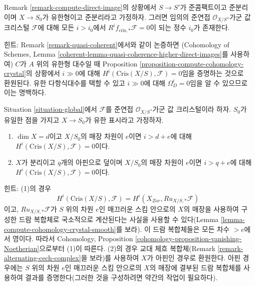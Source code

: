 \begin{remark}[유계성]
\label{remark-bounded-cohomology}
Remark \ref{remark-compute-direct-image}의 상황에서 $S \to S'$가
준콤팩트이고 준분리이며 $X \to S_0$가 유한형이고 준분리라고
가정하자. 그러면 임의의 준연접 $\mathcal{O}_{X/S}$-가군 값
크리스털 $\mathcal{F}$에 대해 모든 $i > i_0$에서
$R^if_{\text{cris}, *}\mathcal{F} = 0$이 되는 정수 $i_0$가 존재한다.

\medskip\noindent
힌트: Remark \ref{remark-quasi-coherent}에서와 같이 논증하면
(Cohomology of Schemes, Lemma
\ref{coherent-lemma-quasi-coherence-higher-direct-images}를 사용하여)
$C$가 $A$ 위의 유한형 대수일 때 Proposition
\ref{proposition-compute-cohomology-crystal}의 상황에서
$i \gg 0$에 대해 $H^i(\text{Cris}(X/S), \mathcal{F}) = 0$임을
증명하는 것으로 환원된다. 유한 다항식대수를 택할 수 있고
$i \gg 0$에 대해 $\Omega^i_D = 0$임을 알 수 있으므로 이는 명백하다.
\end{remark}

\begin{remark}
\label{remark-bounded-cohomology-over-point}
Situation \ref{situation-global}에서 $\mathcal{F}$를 준연접
$\mathcal{O}_{X/S}$-가군 값 크리스털이라 하자. $S_0$가 유일한 점을
가지고 $X \to S_0$가 유한 표시라고 가정하자.
\begin{enumerate}
\item $\dim X = d$이고 $X/S_0$의 매장 차원이 $e$이면
$i > d + e$에 대해 $H^i(\text{Cris}(X/S), \mathcal{F}) = 0$이다.
\item $X$가 분리이고 $q$개의 아핀으로 덮이며 $X/S_0$의 매장
차원이 $e$이면 $i > q + e$에 대해
$H^i(\text{Cris}(X/S), \mathcal{F}) = 0$이다.
\end{enumerate}
힌트: (1)의 경우
$$
H^i(\text{Cris}(X/S), \mathcal{F}) = H^i(X_{Zar}, Ru_{X/S, *}\mathcal{F})
$$
이고, $Ru_{X/S, *}\mathcal{F}$가 $S$ 위의 차원 $e$인 매끄러운
스킴 안으로의 $X$의 매장을 사용하여 구성한 드람 복합체로
국소적으로 계산된다는 사실을 사용할 수 있다(Lemma
\ref{lemma-compute-cohomology-crystal-smooth}를 보라). 이 드람
복합체들은 모든 차수 $> e$에서 영이다. 따라서 Cohomology,
Proposition \ref{cohomology-proposition-vanishing-Noetherian}으로부터
(1)이 따른다. (2)의 경우 교대 체흐 복합체(Remark
\ref{remark-alternating-cech-complex}을 보라)를 사용하여 $X$가
아핀인 경우로 환원한다. 아핀 경우에는 $S$ 위의 차원 $e$인
매끄러운 스킴 안으로의 $X$의 매장에 결부된 드람 복합체를
사용하여 결과를 증명한다(그러한 것을 구성하려면 약간의 작업이
필요하다).
\end{remark}

